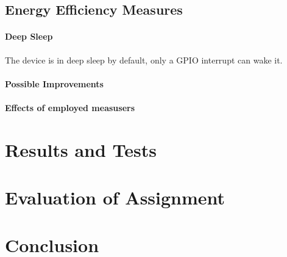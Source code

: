\documentclass{article}
\begin{document}
\subsection*{Energy Efficiency Measures}
\paragraph{Deep Sleep}
The device is in deep sleep by default, only a GPIO interrupt can wake it.

\paragraph{Possible Improvements}

\paragraph{Effects of employed measusers}

\section*{Results and Tests}

\section*{Evaluation of Assignment}
\paragraph{}
\section*{Conclusion}
\paragraph{}

\begin{thebibliography}{9}
\end{thebibliography}
\end{document}
